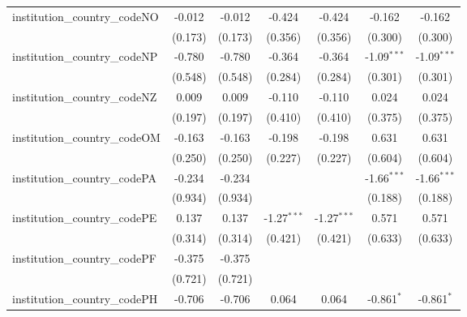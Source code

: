 \begin{tabular}{lcccccc}
   institution\_country\_codeNO          & -0.012         & -0.012         & -0.424         & -0.424         & -0.162         & -0.162\\   
                                         & (0.173)        & (0.173)        & (0.356)        & (0.356)        & (0.300)        & (0.300)\\   
   institution\_country\_codeNP          & -0.780         & -0.780         & -0.364         & -0.364         & -1.09$^{***}$  & -1.09$^{***}$\\   
                                         & (0.548)        & (0.548)        & (0.284)        & (0.284)        & (0.301)        & (0.301)\\   
   institution\_country\_codeNZ          & 0.009          & 0.009          & -0.110         & -0.110         & 0.024          & 0.024\\   
                                         & (0.197)        & (0.197)        & (0.410)        & (0.410)        & (0.375)        & (0.375)\\   
   institution\_country\_codeOM          & -0.163         & -0.163         & -0.198         & -0.198         & 0.631          & 0.631\\   
                                         & (0.250)        & (0.250)        & (0.227)        & (0.227)        & (0.604)        & (0.604)\\   
   institution\_country\_codePA          & -0.234         & -0.234         &                &                & -1.66$^{***}$  & -1.66$^{***}$\\   
                                         & (0.934)        & (0.934)        &                &                & (0.188)        & (0.188)\\   
   institution\_country\_codePE          & 0.137          & 0.137          & -1.27$^{***}$  & -1.27$^{***}$  & 0.571          & 0.571\\   
                                         & (0.314)        & (0.314)        & (0.421)        & (0.421)        & (0.633)        & (0.633)\\   
   institution\_country\_codePF          & -0.375         & -0.375         &                &                &                &   \\   
                                         & (0.721)        & (0.721)        &                &                &                &   \\   
   institution\_country\_codePH          & -0.706         & -0.706         & 0.064          & 0.064          & -0.861$^{*}$   & -0.861$^{*}$\\   

\end{tabular}
